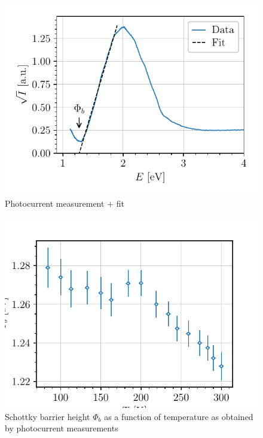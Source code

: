 \begin{figure}[htbp]
    \centering
    \includegraphics[scale=1]{figures/photocurrent_curve.pdf}
    \caption{Photocurrent measurement + fit}
    \label{fig:photocurrent_curve}
\end{figure}

\begin{figure}[htbp]
    \centering
    \includegraphics[scale=1]{figures/photoemission_phi.pdf}
    \caption{Schottky barrier height $\Phi_b$ as a function of temperature as obtained by photocurrent measurements}
    \label{fig:photoemission_phi}
\end{figure}


